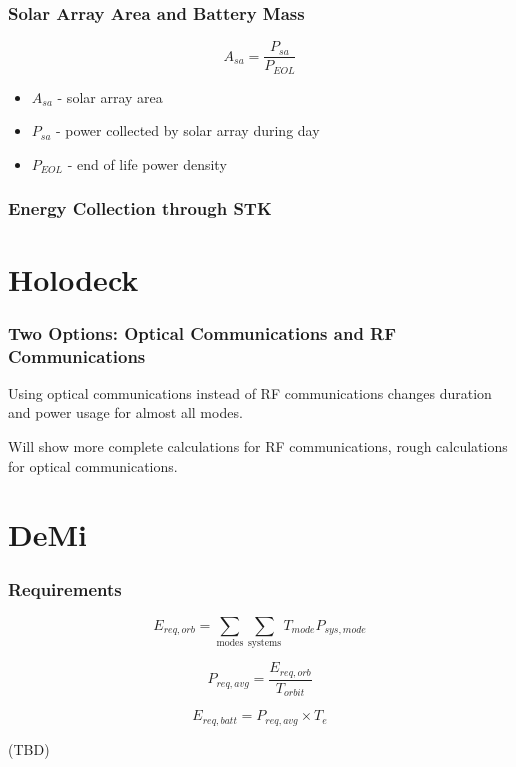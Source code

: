 \documentclass{beamer}
\begin{document}
\begin{frame}
  \frametitle{Solar Array Area and Battery Mass}
  \[A_{sa} = \frac{P_{sa}}{P_{EOL}}\]

  \begin{itemize}
    \item $A_{sa}$ - solar array area
    \item $P_{sa}$ - power collected by solar array during day
    \item $P_{EOL}$ - end of life power density
  \end{itemize}
\end{frame}

\begin{frame}
  \frametitle{Energy Collection through STK}
\end{frame}

\section{Holodeck}
\begin{frame}
  \frametitle{Two Options: Optical Communications and RF Communications}
  \begin{center}
    Using optical communications instead of RF communications changes
    duration and power usage for almost all modes.

    Will show more complete calculations for RF communications, rough
    calculations for optical communications.
  \end{center}
\end{frame}

\section{DeMi}

\begin{frame}
	\frametitle{Requirements}

		
	\[ E_{req,orb} = \sum_\text{modes}{\sum_\text{systems}{T_{mode}P_{sys,mode}}} \]
	
	\[  P_{req,avg} = \frac{E_{req,orb}}{T_{orbit}} \]
	
	\[ E_{req,batt} = P_{req,avg} \times T_e\]
	
	(TBD)
	
\end{frame}
\end{document}
